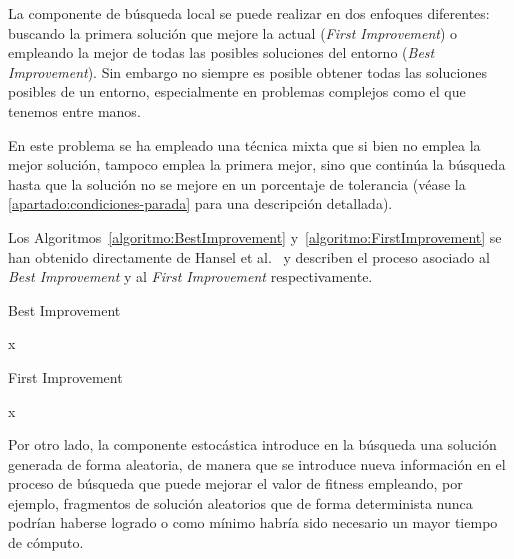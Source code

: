 La componente de búsqueda local se puede realizar en dos enfoques diferentes: buscando la primera solución que mejore la actual (\textit{First Improvement}) o empleando la mejor de todas las posibles soluciones del entorno (\textit{Best Improvement}). Sin embargo no siempre es posible obtener todas las soluciones posibles de un entorno, especialmente en problemas complejos como el que tenemos entre manos. 

En este problema se ha empleado una técnica mixta que si bien no emplea la mejor solución, tampoco emplea la primera mejor, sino que continúa la búsqueda hasta que la solución no se mejore en un porcentaje de tolerancia (véase la \autoref{apartado:condiciones-parada} para una descripción detallada).

Los Algoritmos~\ref{algoritmo:BestImprovement} y~\ref{algoritmo:FirstImprovement} se han obtenido directamente de Hansel et al.~\cite{vns} y describen el proceso asociado al \textit{Best Improvement} y al \textit{First Improvement} respectivamente.

\begin{algorithm}[htbp]
    \caption{Best Improvement}
    \label{algoritmo:BestImprovement}

    \DontPrintSemicolon
    \medskip

    \Return x \;

\end{algorithm}

\begin{algorithm}[htbp]
    \caption{First Improvement}
    \label{algoritmo:FirstImprovement}

    \DontPrintSemicolon
    \medskip

    \Return x \;

\end{algorithm}

Por otro lado, la componente estocástica introduce en la búsqueda una solución generada de forma aleatoria, de manera que se introduce nueva información en el proceso de búsqueda que puede mejorar el valor de fitness empleando, por ejemplo, fragmentos de solución aleatorios que de forma determinista nunca podrían haberse logrado o como mínimo habría sido necesario un mayor tiempo de cómputo.

